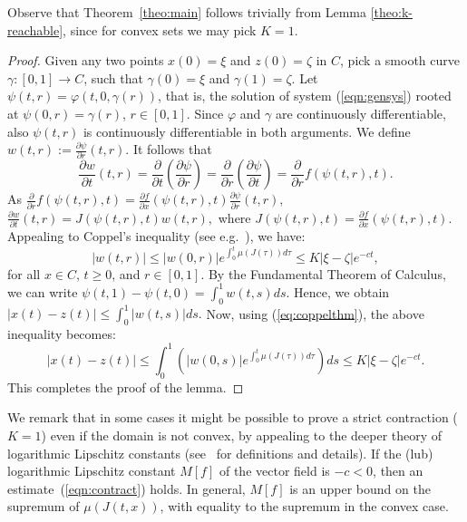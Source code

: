 \documentclass{svmult}
\newcommand{\opteqn}[1]{$#1$}
\newcommand{\abs}[1]{\left\vert #1 \right\vert}
\newcommand{\cc}{c}
\begin{document}
Observe that Theorem~\ref{theo:main}
follows trivially from Lemma \ref{theo:k-reachable}, since for convex sets
we may pick $K=1$.

\begin{proof}
Given any two points $x\left(0\right)= \xi $ and $z\left(0\right)= \zeta $ in
$C$, pick a smooth curve $\gamma : \left[ 0, 1\right] \rightarrow C$, such
that $\gamma \left(0\right)=\xi $ and $\gamma \left(1\right)=\zeta $. Let  
$\psi \left(t,r\right)=\varphi(t,0,\gamma \left(r\right))$, that is,
the solution of system (\ref{eqn:gensys}) rooted at
$\psi \left(0,r\right) =\gamma \left(r\right)$, $r \in [0,1]$. 
Since $\varphi$ and $\gamma $ are continuously differentiable, also
$\psi \left(t,r\right)$ is continuously differentiable in both arguments.
We define
\opteqn{
w(t,r) := \frac{\partial \psi }{\partial r}(t,r).
}
It follows that
\[
\frac{\partial w}{\partial t}(t,r) = \frac{\partial}{\partial t}\left(\frac{\partial \psi }{\partial r}\right)=\frac{\partial}{\partial r}\left(\frac{\partial \psi }{\partial t}\right)=\frac{\partial}{\partial r}f(\psi \left(t,r\right),t).
\]
As
\opteqn{
\frac{\partial}{\partial r}f(\psi \left(t,r\right),t) = \frac{\partial f}{\partial x}(\psi \left(t,r\right),t)\frac{\partial \psi }{\partial r}(t,r),
}
\opteqn{
\frac{\partial w}{\partial t}(t,r) = J(\psi \left(t,r\right),t) w(t,r),
}
where $J(\psi \left(t,r\right),t) = \frac{\partial f}{\partial x}(\psi \left(t,r\right),t)$.
Appealing to  Coppel's inequality (see e.g.~\cite{Vid_93}), we have:
\begin{equation} \label{eq:coppelthm}
\abs{w(t,r)} \le \abs{w(0,r)}  e^{\int_{0}^t \mu \left( J\left(\tau \right)\right)d\tau }\leq K \abs{\xi -\zeta } e^{-\cc t},
\end{equation}
for all $x \in C$, $t\geq 0$, and $r \in [0,1]$. 
By the Fundamental Theorem of Calculus, we can write
\opteqn{
\psi \left(t,1\right)-\psi \left(t,0\right) = \int_0^1{w(t,s)} ds .
}
Hence, we obtain
\opteqn{
\abs{x(t)-z(t)} \leq \int_0^1{\abs{w(t,s)}}ds.
}
Now, using (\ref{eq:coppelthm}), the above inequality becomes:
\[
\abs{x(t)-z(t)} \le \int_0^1 \left(\abs{w(0,s)}  e^{\int_{0}^t \mu \left( J\left(\tau \right)\right)d\tau } \right) ds \le K \abs{\xi -\zeta }e^{-\cc t}.
\]
This completes the proof of the lemma.
\end{proof}

We remark that in some cases it might be possible to prove a strict contraction
($K=1$) even if the domain is not convex, by appealing to the deeper theory
of logarithmic Lipschitz constants (see~\cite{soderlind} for definitions and
details).  If the (lub) logarithmic Lipschitz constant $M[f]$ of the vector
field is $-c<0$, then an estimate~(\ref{eqn:contract}) holds.  
In general, $M[f]$ is an upper bound on the supremum of $\mu (J(t,x))$,
with equality to the supremum in the convex case.
\end{document}
